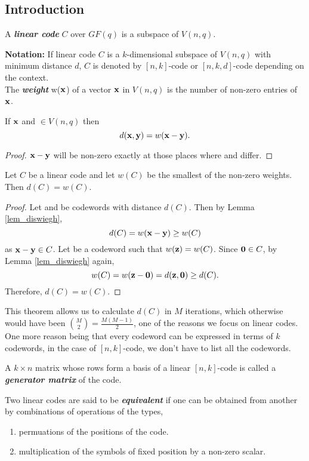 \documentclass[../main.tex]{subfiles}
\begin{document}
\subsection{Introduction}		
\begin{defn}
	A \textbf{\emph{linear code}} $C$ over $GF(q)$ is a subspace of $V(n,q)$. 
\end{defn}		
\textbf{Notation:} If linear code $C$ is a $k$-dimensional subspace of $V(n,q)$ with minimum distance $d$, $C$ is denoted by $[n,k]$-code or $[n,k,d]$-code depending on the context.\\

The \textbf{\emph{weight}} w($\textbf{x}$) of a vector $\textbf{x}$ in $V(n,q)$ is the number of non-zero entries of $\textbf{x}$.
\begin{lem}\label{lem_diswiegh}
	If $\textbf{x}$ and  $\in V(n,q)$ then 
	\[
		d(\textbf{x},\textbf{y})=w(\textbf{x}-\textbf{y}).
	\]
\end{lem}
\begin{proof}
	$\textbf{x}-\textbf{y}$ will be non-zero exactly at those places where  and   differ.
\end{proof}
\begin{thm}
	Let $C$ be a linear code and let $w(C)$ be the smallest of the non-zero weights. Then $d(C)=w(C).$ 
\end{thm} 
\begin{proof}
	Let  and  be codewords with distance $d(C)$. Then by Lemma \ref{lem_diswiegh},
	\[
		d(C)=w(\textbf{x}-\textbf{y}) \geq w(C)
	\]
	as $\textbf{x}-\textbf{y}\in C$. Let  be a codeword such that $w(\textbf{z})=w(C)$. Since $\textbf{0}\in C$, by Lemma \ref{lem_diswiegh} again,
	\[
		w(C)=w(\textbf{z}-\textbf{0})=d(\textbf{z},\textbf{0})\geq d(C).
	\]
	Therefore, $d(C)=w(C)$.
\end{proof}
This theorem allows us to calculate $d(C)$ in $M$ iterations, which otherwise would have been $\binom{M}{2}=\frac{M(M-1)}{2}$, one of the reasons we focus on linear codes. One more reason being that every codeword can be expressed in terms of $k$ codewords, in the case of $[n,k]$-code, we don't have to list all the codewords.  	

\begin{defn}
	A $k\times n$ matrix whose rows form a basis of a linear $[n,k]$-code is called a \textbf{\emph{generator matrix}} of the code.
\end{defn}
\begin{defn}
	Two linear codes are said to be \textbf{\emph{equivalent}} if one can be obtained from another by combinations of operations of the types,\;
	\begin{enumerate}[label=(\roman*)]
	\itemsep-1mm
		\item permuations of the positions of the code.
		\item multiplication of the symbols of fixed position by a non-zero scalar.
	\end{enumerate}
\end{defn}
\end{document}

